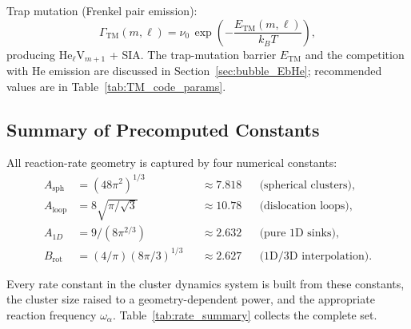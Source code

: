 Trap mutation (Frenkel pair emission):
\begin{equation}\label{eq:trap_mutation_rate}
    \Gamma_{\mathrm{TM}}(m,\ell)
    = \nu_0\,\exp\!\left(-\frac{E_{\mathrm{TM}}(m,\ell)}{k_BT}\right),
\end{equation}
producing He$_\ell$V$_{m+1}$ + SIA. The trap-mutation barrier
$E_{\mathrm{TM}}$ and the competition with He emission are discussed in
Section~\ref{sec:bubble_EbHe}; recommended values are in
Table~\ref{tab:TM_code_params}.

\subsection{Summary of Precomputed Constants}
\label{sec:rate_constants_summary}

All reaction-rate geometry is captured by four numerical constants:
\begin{equation}\label{eq:constants}
    \begin{aligned}
        A_{\mathrm{sph}} &= (48\pi^2)^{1/3} &&\approx 7.818
        && \text{(spherical clusters)}, \\
        A_{\mathrm{loop}} &= 8\sqrt{\pi/\sqrt{3}} &&\approx 10.78
        && \text{(dislocation loops)}, \\
        A_{1D} &= 9/(8\pi^{2/3}) &&\approx 2.632
        && \text{(pure 1D sinks)}, \\
        B_{\mathrm{rot}} &= (4/\pi)(8\pi/3)^{1/3} &&\approx 2.627
        && \text{(1D/3D interpolation)}.
    \end{aligned}
\end{equation}

Every rate constant in the cluster dynamics system is built from these
constants, the cluster size raised to a geometry-dependent power, and the
appropriate reaction frequency $\omega_\alpha$. Table~\ref{tab:rate_summary}
collects the complete set.

